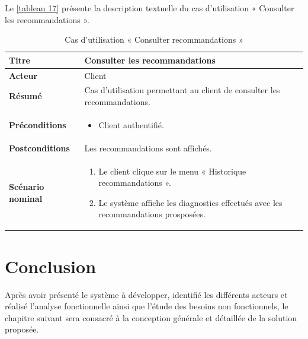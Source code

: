 Le \autoref{tableau 17} présente la description textuelle du cas d'utilisation « Consulter les recommandations ».

\begin{table}[H]
\centering
\renewcommand{\arraystretch}{1.4}
\begin{tabular}{|p{4cm}|p{10cm}|}
\hline
\textbf{Titre} & Consulter les recommandations \\
\hline
\textbf{Acteur} & Client \\
\hline
\textbf{Résumé} & Cas d'utilisation permettant au client de consulter les recommandations. \\
\hline
\textbf{Préconditions} &
\vspace{-12pt}
\begin{itemize}
    \item Client authentifié.
\end{itemize} \\
\hline
\textbf{Postconditions} & Les recommandations sont affichés. \\
\hline
\textbf{Scénario nominal} &
\vspace{-12pt}
\begin{enumerate}
    \item Le client clique sur le menu « Historique recommandations ».
    \item Le système affiche les diagnostics effectués avec les recommandations prosposées.
\end{enumerate} \\
\hline
\end{tabular}
\caption{Cas d'utilisation « Consulter recommandations »}
\label{tableau 17}
\end{table}

\section*{Conclusion}

Après avoir présenté le système à développer, identifié les différents acteurs et réalisé l'analyse fonctionnelle ainsi que l'étude des besoins non fonctionnels, le chapitre suivant sera consacré à la conception générale et détaillée de la solution proposée.
